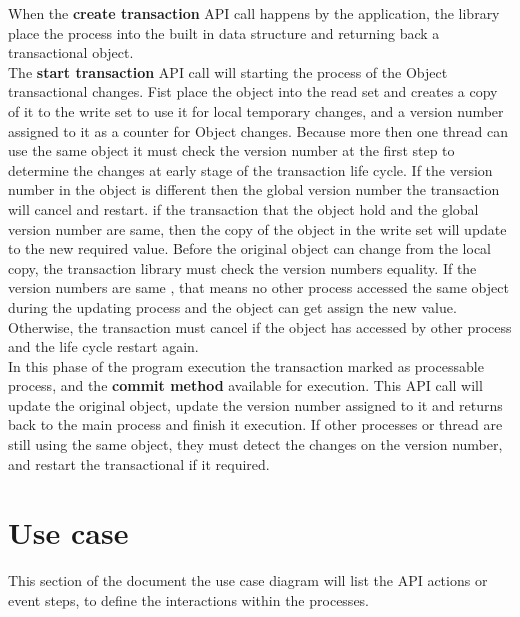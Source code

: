 \documentclass[12pt]{article}
\begin{document}
When the \textbf{create transaction} API call happens by the application, the library place the process into the built in data structure and returning back a transactional object.\\

The \textbf{start transaction} API call will starting the process of the Object transactional changes. Fist place the object into the read set and creates a copy of it to the write set to use it for local temporary changes, and a version number assigned to it as a counter for Object changes. Because more then one thread can use the same object it must check the version number at the first step to determine the changes at early stage of the transaction life cycle. If the version number in the object is different then the global version number the transaction will cancel and restart. if the transaction that the object hold and the global version number are same, then the copy of the object in the write set will update to the new required value. Before the original object can change from the local copy, the transaction library must check the version numbers equality. If the version numbers are same , that means no other process accessed the same object during the updating process and the object can get assign the new value. Otherwise, the transaction must cancel if the object has accessed by other process and the life cycle restart again.\\

In this phase of the program execution the transaction marked as processable process, and the \textbf{commit method} available for execution. This API call will update the original object, update the version number assigned to it and returns back to the main process and finish it execution. If other processes or thread are still using the same object, they must detect the changes on the version number, and restart the transactional if it required.

\section{Use case}
This section of the document the use case diagram will list the API actions or event steps, to define the interactions within the processes.
\end{document}
